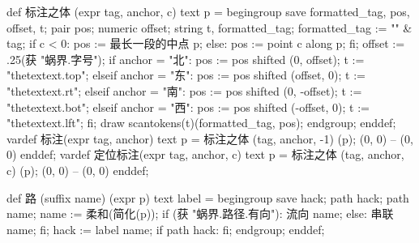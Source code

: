 def 标注之体 (expr tag, anchor, c) text p =
  begingroup
    save formatted_tag, pos, offset, t;
    pair pos; numeric offset; string t, formatted_tag;
    formatted_tag := "\tfx" & tag;
    if c < 0:
      pos := 最长一段的中点 p;
    else:
      pos := point c along p;
    fi;
    offset := .25(获 "蜗界.字号");
    if anchor = "北":
      pos := pos shifted (0, offset);
      t := "thetextext.top";
    elseif anchor = "东":
      pos := pos shifted (offset, 0);
      t := "thetextext.rt";
    elseif anchor = "南":
      pos := pos shifted (0, -offset);
      t := "thetextext.bot";
    elseif anchor = "西":
      pos := pos shifted (-offset, 0);
      t := "thetextext.lft";
    fi;
    draw scantokens(t)(formatted_tag, pos);
  endgroup;
enddef;
vardef 标注(expr tag, anchor) text p =
  标注之体 (tag, anchor, -1) (p);
  (0, 0) -- (0, 0)
enddef;
vardef 定位标注(expr tag, anchor, c) text p =
  标注之体 (tag, anchor, c) (p);
  (0, 0) -- (0, 0)
enddef;
\stopMPinclusions

\startMPinclusions[+]
def 路 (suffix name) (expr p) text label =
  begingroup
  save hack; path hack;
  path name; name := 柔和(简化(p));
  if (获 "蜗界.路径.有向"):
    流向 name;
  else:
    串联 name;
  fi;
  hack := label name;
  if path hack: fi;
  endgroup;
enddef;
\stopMPinclusions

